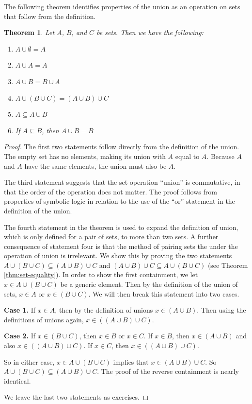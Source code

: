 \documentclass[
]{book}
\newtheorem{theorem}{Theorem}[chapter]
\theoremstyle{definition}
\theoremstyle{definition}
\theoremstyle{definition}
\theoremstyle{definition}
\theoremstyle{remark}
\begin{document}
The following theorem identifies properties of the union as an operation on sets that follow from the definition.

\begin{theorem}

Let \(A\), \(B\), and \(C\) be sets. Then we have the following:

\begin{enumerate}
\def\labelenumi{\arabic{enumi}.}
\item
  \(A\cup \emptyset = A\)
\item
  \(A \cup A = A\)
\item
  \(A \cup B = B \cup A\)
\item
  \(A \cup (B\cup C ) = (A\cup B) \cup C\)
\item
  \(A \subseteq A \cup B\)
\item
  If \(A \subseteq B\), then \(A\cup B=B\)
\end{enumerate}

\end{theorem}

\begin{proof}
The first two statements follow directly from the definition of the union. The empty set has no elements, making its union with \(A\) equal to \(A\). Because \(A\) and \(A\) have the same elements, the union must also be \(A\).

The third statement suggests that the set operation ``union'' is commutative, in that the order of the operation does not matter. The proof follows from properties of symbolic logic in relation to the use of the ``or'' statement in the definition of the union.

The fourth statement in the theorem is used to expand the definition of union, which is only defined for a pair of sets, to more than two sets. A further consequence of statement four is that the method of pairing sets the under the operation of union is irrelevant. We show this by proving the two statements \(A \cup (B\cup C ) \subseteq (A\cup B) \cup C\) and \((A\cup B) \cup C \subseteq A \cup (B\cup C)\) (see Theorem \ref{thm:set-equality}). In order to show the first containment, we let \(x\in A \cup (B\cup C )\) be a generic element. Then by the definition of the union of sets, \(x\in A\) or \(x\in (B\cup C)\). We will then break this statement into two cases.

\textbf{Case 1.} If \(x\in A\), then by the definition of unions \(x\in (A \cup B)\). Then using the definitions of unions again, \(x \in ((A \cup B) \cup C)\).

\textbf{Case 2.} If \(x\in (B\cup C)\), then \(x\in B\) or \(x\in C\). If \(x\in B\), then \(x\in (A\cup B)\) and also \(x\in ((A\cup B) \cup C)\). If \(x\in C\), then \(x\in ((A\cup B) \cup C)\).

So in either case, \(x \in A \cup (B\cup C)\) implies that \(x\in (A\cup B) \cup C\). So \(A\cup (B\cup C) \subseteq (A\cup B)\cup C\). The proof of the reverse containment is nearly identical.

We leave the last two statements as exercises.
\end{proof}
\end{document}
